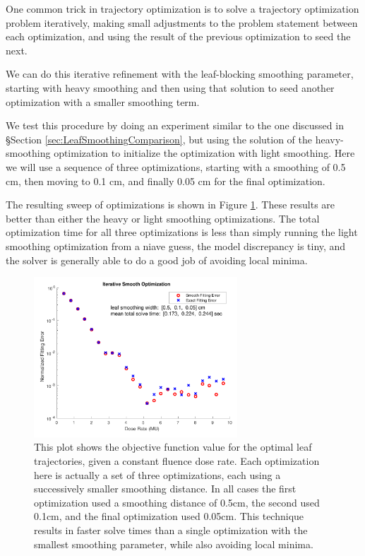 \documentclass[12pt]{article}
\begin{document}
One common trick in trajectory optimization is to solve a trajectory optimization problem
iteratively, making small adjustments to the problem statement between each optimization,
and using the result of the previous optimization to seed the next.

We can do this iterative refinement with the leaf-blocking smoothing parameter,
starting with heavy smoothing and then using that solution to seed another optimization
with a smaller smoothing term.

We test this procedure by doing an experiment similar to the one discussed in
\S Section \ref{sec:LeafSmoothingComparison}, but using the solution of the heavy-smoothing
optimization to initialize the optimization with light smoothing.
Here we will use a sequence of three optimizations, starting with a smoothing of
0.5 cm, then moving to 0.1 cm, and finally 0.05 cm for the final optimization.

The resulting sweep of optimizations is shown in Figure \ref{fig:iterSmoothSweep}.
These results are better than either the heavy or light smoothing optimizations.
The total optimization time for all three optimizations is less than simply running the
light smoothing optimization from a niave guess, the model discrepancy is tiny, and the
solver is generally able to do a good job of avoiding local minima.

\begin{figure}
  \centering
  \includegraphics[width=3in]{fig/iterSmoothSweep.pdf}
  \caption{This plot shows the objective function value for the optimal leaf trajectories,
           given a constant fluence dose rate. Each optimization here is actually a set of three
           optimizations, each using a successively smaller smoothing distance. In all cases
           the first optimization used a smoothing distance of 0.5cm, the second used 0.1cm,
           and the final optimization used 0.05cm. This technique results in faster solve times
           than a single optimization with the smallest smoothing parameter, while also avoiding
           local minima.}
  \label{fig:iterSmoothSweep}
\end{figure}
\end{document}
